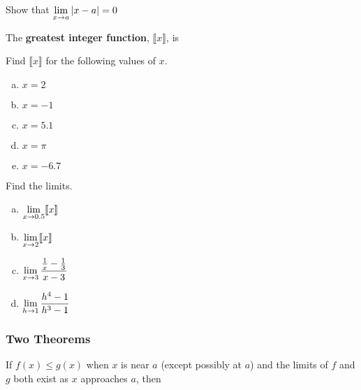 \documentclass[notes]{subfiles}
\begin{document}
		\begin{ex}
			Show that $\displaystyle \lim_{x\to a} |x-a| = 0$
		\end{ex}		
			
		\begin{defn}
			The \textbf{greatest integer function}, $\llbracket x\rrbracket$, is 
		\end{defn}
			
		\begin{ex}
			Find $\llbracket x\rrbracket$ for the following values of $x$.
			\begin{enumerate}[(a)]
				\item $x = 2$
					
				\item $x = -1$
					
				\item $x = 5.1$
					
				\item $x = \pi$
					
				\item $x = -6.7$
					
			\end{enumerate}
		\end{ex}		
			\newpage
		
		\begin{ex}
			Find the limits.
			\begin{enumerate}[(a)]
				\item $\displaystyle\lim_{x\to 0.5} \llbracket x \rrbracket$
					\vs{1}
					
				\item $\displaystyle\lim_{x\to 2} \llbracket x\rrbracket$
					\vs{1}
					
				\item $\displaystyle \lim_{x\to 3} \dfrac{\frac{1}{x}-\frac{1}{3}}{x-3}$
					\vs{1}
					
				\item $\displaystyle\lim_{h\to 1} \dfrac{h^4-1}{h^3-1}$
					\vs{1}
					
			\end{enumerate}
		\end{ex}	
			\newpage
			
	\subsubsection*{Two Theorems}
		\begin{thm}
			If $f(x)\leq g(x)$ when $x$ is near $a$ (except possibly at $a$) and the limits of $f$ and $g$ both exist as $x$ approaches $a$, then
		\end{thm}
			
\end{document}
